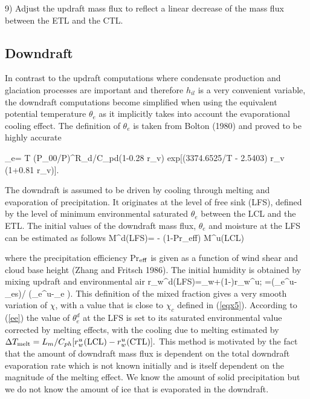 9) Adjust the updraft mass flux to reflect a linear decrease of the mass
flux between the ETL and the CTL.


\subsection{Downdraft}

In contrast to the updraft computations
where condensate production and glaciation
processes are important and therefore $h_{il}$ is a very convenient
variable, the downdraft computations  become
simplified when using the equivalent potential temperature
$\theta_e$ as it implicitly takes into account the evaporational
cooling effect. The definition of $\theta_e$ is taken from Bolton (1980)
and proved to be highly accurate

\beq
\theta_e= T (P_{00}/P)^{R_d/C_{pd}(1-0.28 r_v)}
{\rm exp}[(3374.6525/T - 2.5403) r_v (1+0.81 r_v)].
\eeq

\noindent
The downdraft is assumed to be driven by cooling through melting and
evaporation of precipitation.
It originates at the level of free sink (LFS),
defined by the level of minimum environmental saturated $\theta_e$
between the LCL and the ETL.
The initial values of the downdraft mass flux, $\theta_e$ and moisture at
the LFS can be estimated as follows
\beq
M^d(LFS)= - (1-{\rm Pr_{eff}}) M^u(LCL)
\eeq

\noindent
where the precipitation efficiency Pr$_{\rm eff}$ is given as a function
of wind shear and cloud base height (Zhang and Fritsch 1986).
The initial humidity is obtained by mixing updraft and environmental air
\beq
r_w^d({\rm LFS})=\chi {}_w+(1-\chi)r_w^u; \quad
\chi=(\theta_e^u-\overline{\theta}_{es})/
(\theta_e^u-\overline{\theta}_e ).
\label{ee}
\eeq
\noindent
 This definition of the mixed fraction
 gives a very smooth variation of $\chi$, with a value
 that is close to $\chi_c$ defined in (\ref{eqx5}).
According to (\ref{ee})  the value of $\theta_e^d$ at the LFS is
set to its saturated environmental value corrected by melting effects,
with  the cooling due to melting estimated by
$\Delta T_{\rm melt}=
L_m/C_{ph}[r_w^u({\rm LCL})-r_w^u({\rm CTL})].
$
 This method is motivated by the fact
that the amount of downdraft mass flux is dependent on the total downdraft
evaporation rate which is not known initially and is itself dependent on
the magnitude of the melting effect. We know the amount of solid
precipitation but we do not know the amount of ice that is evaporated in
the downdraft.


